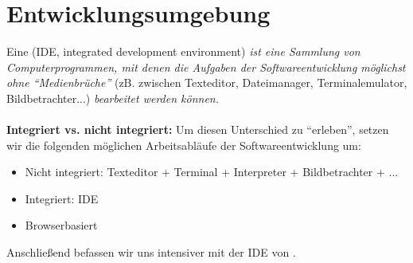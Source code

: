 \section{Entwicklungsumgebung}
Eine  (IDE, integrated development environment) \textit{ist eine Sammlung von Computerprogrammen, mit denen die Aufgaben der Softwareentwicklung möglichst ohne ``Medienbrüche''} (zB. zwischen Texteditor, Dateimanager, Terminalemulator, Bildbetrachter...) \textit{bearbeitet werden können.} ~\\
~\\
\textbf{Integriert vs. nicht integriert:} Um diesen Unterschied zu ``erleben'', setzen  wir die folgenden möglichen Arbeitsabläufe der Softwareentwicklung um:
\begin{itemize}
	\item Nicht integriert: Texteditor + Terminal + Interpreter + Bildbetrachter + ...
	\item Integriert: IDE
	\item Browserbasiert
\end{itemize}
Anschließend befassen wir uns intensiver mit der IDE \pycharm von \jetbrains.
%
%
%

